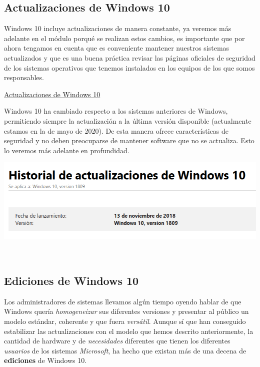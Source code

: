 \documentclass[11pt]{article}
\begin{document}
\subsection{Actualizaciones de Windows 10}
\label{sec:org4cd10c3}
Windows 10 incluye actualizaciones de manera constante, ya veremos más
adelante en el módulo porqué se realizan estos cambios, es importante
que por ahora tengamos en cuenta que es conveniente mantener nuestros
sistemas actualizados y que es una buena práctica revisar las páginas
oficiales de seguridad de los sistemas operativos que tenemos instalados
en los equipos de los que somos responsables.

\href{https://support.microsoft.com/es-es/help/4464619/windows-10-update-history}{Actualizaciones
de Windows 10}

Windows 10 ha cambiado respecto a los sistemas anteriores de Windows,
permitiendo siempre la actualización a la última versión disponible
(actualmente estamos en la de mayo de 2020). De esta manera ofrece características
de seguridad y no deben preocuparse de mantener software que no se
actualiza. Esto lo veremos más adelante en profundidad.

\begin{center}
\includegraphics[width=.9\linewidth]{Versiones/windows10-1809.png}
\end{center}  

\subsection{Ediciones de Windows 10}
\label{sec:org62e32b1}

Los administradores de sistemas llevamos algún tiempo oyendo hablar de que Windows
quería \emph{homogeneizar} sus diferentes versiones y presentar al público un modelo estándar,
coherente y que fuera \emph{versátil}. Aunque sí que han conseguido estabilizar las actualizaciones
con el modelo que hemos descrito anteriormente, la cantidad de hardware y de \emph{necesidades} diferentes
que tienen los diferentes \emph{usuarios} de los sistemas \emph{Microsoft}, ha hecho que existan más de una decena 
de \textbf{ediciones} de Windows 10.
\end{document}
